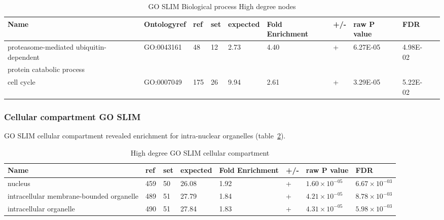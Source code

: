 \begin{table}
\centering
\begin{adjustbox}{max width=\textwidth}
\begin{tabular}{l l l l l l l l l l}
Name & Ontologyref &ref & set&	expected &	Fold Enrichment &	+/-	&raw P value&FDR\\
\hline
proteasome-mediated ubiquitin-dependent &GO:0043161 & 48 & 	12 &	2.73 &	4.40 & 	+ & 	6.27E-05 & 	4.98E-02 \\
protein catabolic process\\
cell cycle& GO:0007049&	175 	&26 &	9.94& 	2.61 &	+ & 	3.29E-05& 5.22E-02\\
\end{tabular}
\end{adjustbox}
\caption{GO SLIM Biological process High degree nodes}
\label{tab: high degree slim biological process}
\end{table}

\subsubsection{Cellular compartment GO SLIM}
GO SLIM cellular compartment revealed enrichment for intra-nuclear organelles (table~\ref{tab: high degree slim cellular compartment}).

\begin{table}
\centering
\begin{adjustbox}{max width=\textwidth}
\begin{tabular}{llllllll}
  Name  &ref &set &	expected &	Fold Enrichment &	+/-	&raw P value&FDR\\
\hline
nucleus &	459& 	50& 	26.08& 	1.92& 	+ &	$1.60\times 10^{-05}$& 	$6.67\times 10^{-03}$\\
intracellular membrane-bounded organelle&	489&	51&	27.79&	1.84&	+&	$4.21\times10^{-05}$ &	$8.78\times 10^{-03}$\\
intracellular organelle&	490&	51&	27.84&	1.83&	+&	$4.31\times 10^{-05}$&	$5.98\times10^{-03}$\\
\end{tabular}
\end{adjustbox}
\caption{High degree GO SLIM cellular compartment}
\label{tab: high degree slim cellular compartment}
\end{table}

